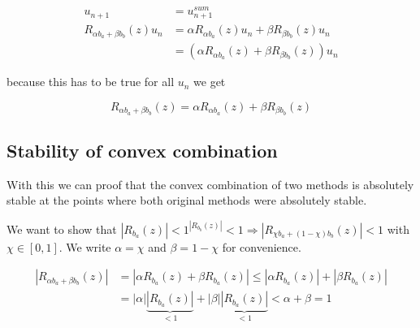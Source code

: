 \documentclass{article}
\begin{document}
\begin{align}
u_{n+1} &= u_{n+1}^{sum} \\
R_{\alpha b_a+\beta b_b}(z) u_n &= \alpha R_{\alpha b_a}(z) u_n + \beta R_{\beta b_b}(z) u_n \\
&= (\alpha R_{\alpha b_a}(z) + \beta R_{\beta b_b}(z)) u_n
\end{align}

because this has to be true for all $u_n$ we get

\begin{equation}
R_{\alpha b_a+\beta b_b}(z) = \alpha R_{\alpha b_a}(z) + \beta R_{\beta b_b}(z) 
\end{equation}

\subsection{Stability of convex combination}\label{proof:convex_comb}

With this we can proof that the convex combination of two methods is absolutely stable at the points where both original methods were absolutely stable.

We want to show that $|R_{b_a}(z)|  < 1 ^ |R_{b_b}(z)| < 1\Rightarrow |R_{\chi b_a +(1- \chi) b_b}(z)| < 1$ with $\chi \in [0,1]$.
We write $\alpha = \chi$ and $\beta = 1-\chi$ for convenience.

\begin{align}
|R_{\alpha b_a +\beta b_b}(z)| &= |\alpha R_{b_a}(z) + \beta R_{b_a}(z)| \leq |\alpha R_{b_a}(z)| + |\beta R_{b_a}(z)|\\
 &=| \alpha| \underbrace{|R_{b_a}(z)|}_{<1} + |\beta| \underbrace{|R_{b_a}(z)|}_{<1} < \alpha + \beta = 1
\end{align}
\end{document}
